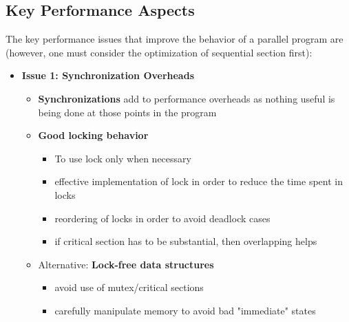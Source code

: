\documentclass[12pt, a4paper]{report}
\begin{document}
\subsection{Key Performance Aspects}
The key performance issues that improve the behavior of a parallel program are (however, one must consider the optimization of sequential section first):
\begin{itemize}
    \item {\bfseries{Issue 1: Synchronization Overheads}}
    \begin{itemize}
        \item {\bfseries{Synchronizations}} add to performance overheads as nothing useful is being done at those points in the program
        \item {\bfseries{Good locking behavior}}
        \begin{itemize}
            \item To use lock only when necessary
            \item effective implementation of lock in order to reduce the time spent in locks
            \item reordering of locks in order to avoid deadlock cases
            \item if critical section has to be substantial, then overlapping helps
        \end{itemize}
        \item Alternative: {\bfseries{Lock-free data structures}}
        \begin{itemize}
            \item avoid use of mutex/critical sections
            \item carefully manipulate memory to avoid bad "immediate" states
        \end{itemize}
    \end{itemize}
          

\end{itemize}
\end{document}
